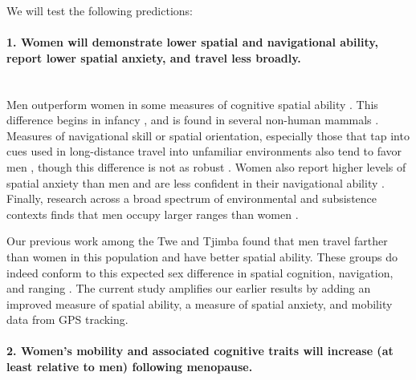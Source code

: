 We will test the following predictions:	
	
\paragraph{1. Women will demonstrate lower spatial and navigational ability, report lower spatial anxiety, and travel less broadly.}\mbox{}\\

Men outperform women in some measures of cognitive spatial ability \citep{sanders1982sex, shepard1971mental, eals1994hunter, lawton2010gender}.  This difference begins in infancy \citep{quinn2008sex, moore2008mental, levine1999early}, and is found in several non-human mammals \citep{javsarevic2012spatial, perdue2011sex, gaulin1986sex}.  Measures of navigational skill or spatial orientation, especially those that tap into cues used in long-distance travel into unfamiliar environments also tend to favor men \citep{moffat1998navigation, bryant1982personality, galea1993sex, henrie1997gender}, though this difference is not as robust \citep{coluccia2004gender, burke2012women, gilmartin1984comparing, montello1999comparison}.  Women also report higher levels of spatial anxiety than men and are less confident in their navigational ability \citep{devlin1995interactive, lawton1994gender, picucci2011besides}.  Finally, research across a broad spectrum of environmental and subsistence contexts finds that men occupy larger ranges than women \citep{ecuyer2004have, gaulin1988evolution, macdonald1999reproductive}.

Our previous work among the Twe and Tjimba found that men travel farther than women in this population and have better spatial ability.  These groups do indeed conform to this expected sex difference in spatial cognition, navigation, and ranging \citep{vashro2014spatial}. The current study amplifies our earlier results by adding an improved measure of spatial ability, a measure of spatial anxiety, and mobility data from GPS tracking.

\paragraph{2.  Women's mobility and associated cognitive traits will increase (at least relative to men) following menopause.}\mbox{}\\

